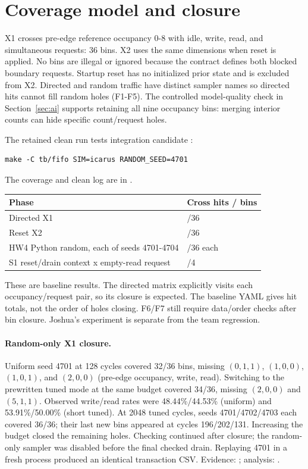 \section{Coverage model and closure}
\label{sec:coverage}

X1 crosses pre-edge reference occupancy 0-8 with idle, write, read, and
simultaneous requests: 36 bins. X2 uses the same dimensions when reset is
applied. No bins are illegal or ignored because the contract defines both
blocked boundary requests. Startup reset has no initialized prior state
and is excluded from X2. Directed and random traffic have distinct sampler
names so directed hits cannot fill random holes (F1-F5). The controlled model-quality check in
Section~\ref{sec:ai} supports retaining all nine occupancy bins: merging
interior counts can hide specific count/request holes.

The retained clean run tests integration candidate :

\begin{verbatim}
make -C tb/fifo SIM=icarus RANDOM_SEED=4701
\end{verbatim}

The coverage and clean log are in .

\begin{center}
\begin{tabular}{@{}>{\raggedright\arraybackslash}p{}>{\raggedright\arraybackslash}p{}@{}}
\toprule
Phase & Cross hits / bins \\
\midrule
Directed X1 & 36/36 \\
Reset X2 & 36/36 \\
HW4 Python random, each of seeds 4701-4704 & 36/36 each \\
S1 reset/drain context x empty-read request & 4/4 \\
\bottomrule
\end{tabular}
\end{center}

These are baseline results. The directed matrix
explicitly visits each occupancy/request pair, so its closure is expected.
The baseline YAML gives hit totals, not the order of holes closing. F6/F7
still require data/order checks after bin closure. Joshua's 
experiment is separate from the team  regression.

\paragraph{Random-only X1 closure.} Uniform seed 4701 at 128 cycles covered
32/36 bins, missing $(0,1,1)$, $(1,0,0)$, $(1,0,1)$, and $(2,0,0)$
(pre-edge occupancy, write, read). Switching to the prewritten tuned mode
at the same budget covered 34/36, missing $(2,0,0)$ and $(5,1,1)$.
Observed write/read rates were 48.44\%/44.53\% (uniform) and
53.91\%/50.00\% (short tuned). At 2048 tuned cycles, seeds 4701/4702/4703
each covered 36/36; their last new bins appeared at cycles 196/202/131.
Increasing the budget closed the remaining holes. Checking continued after
closure; the random-only sampler was disabled before the final checked drain.
Replaying 4701 in a fresh process produced an identical transaction CSV.
Evidence: ; analysis: .
